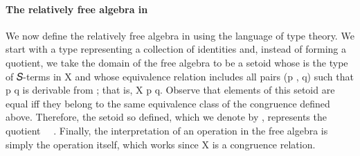 \paragraph*{The relatively free algebra in \agda}
We now define the relatively free algebra in \agda using the language of type theory.
We start with a type  representing a collection of identities and, instead of
forming a quotient, we take the domain of the free algebra to be a setoid whose
 is the type  of {𝑆}-terms in \ab X and whose equivalence relation
includes all pairs (\ab p , \ab q)     such that \ab p 
\ab q is derivable from ; that is,   \ab X  \ab p  \ab q.
Observe that elements of this setoid are equal iff they belong to the same equivalence
class of the congruence  defined above.  Therefore, the setoid so defined, which
we denote by , represents the quotient ~\af{/}~.
Finally, the interpretation of an operation in the free algebra is simply the operation
itself, which works since   \ab X  is a congruence relation.

